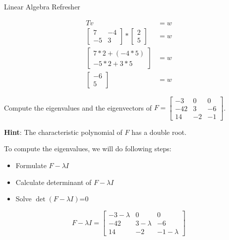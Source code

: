 \documentclass[
	english,
        solution=true
	]{tudaexercise}
\begin{document}
\begin{task}[points=28]{Linear Algebra Refresher}
\begin{subtask}[points=5,title=Basis Transformation ]
\begin{solution}
\begin{align*}
    Tv&=w\\
    \begin{bmatrix}
    7 & -4 \\ -5 & 3
\end{bmatrix}*\begin{bmatrix}
    2 \\ 5
\end{bmatrix}&=w\\
\begin{bmatrix}
    7*2+(-4*5) \\ -5*2+3*5
\end{bmatrix}&=w\\
\begin{bmatrix}
    -6 \\ 5
\end{bmatrix}&= w 
\end{align*}


\end{solution}
\end{subtask}


\newpage

\begin{subtask} [points=5,title=Matrix Decomposition]

Compute the eigenvalues and the eigenvectors of 
$F = 
\begin{bmatrix}
    -3  & 0  & 0  \\
    -42 & 3  & -6 \\
    14  & -2 & -1
\end{bmatrix}$.

\textbf{Hint}: The characteristic polynomial of $F$ has a double root.

\begin{solution}
To compute the eigenvalues, we will do following steps:
\begin{itemize}
    \item Formulate $F-\lambda I$
    \item Calculate determinant of $F-\lambda I$
    \item Solve $\det(F-\lambda I)$=0
\end{itemize}

\[
    F-\lambda I=\begin{bmatrix}
        -3-\lambda & 0 & 0 \\ -42 & 3-\lambda & -6 \\ 14 & -2 & -1-\lambda
    \end{bmatrix}\]
    

\end{solution}
\end{subtask}
\end{task}
\end{document}
